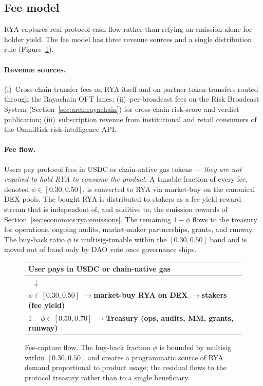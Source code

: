 \documentclass[11pt,a4paper]{article}
\begin{document}
\subsection{Fee model}\label{sec:economics:rya:fees}

RYA captures real protocol cash flow rather than relying on emission alone for
holder yield. The fee model has three revenue sources and a single distribution rule
(Figure~\ref{fig:rya-fee-flow}).

\paragraph{Revenue sources.} (i)~Cross-chain transfer fees on RYA itself and on
partner-token transfers routed through the Rayachain OFT lanes; (ii)~per-broadcast
fees on the Risk Broadcast System (Section~\ref{sec:arch:rayachain}) for cross-chain
risk-score and verdict publication; (iii)~subscription revenue from institutional
and retail consumers of the OmniRisk risk-intelligence API.

\paragraph{Fee flow.} Users pay protocol fees in USDC or chain-native gas tokens
--- \emph{they are not required to hold RYA to consume the product}. A tunable
fraction of every fee, denoted $\phi \in [0.30, 0.50]$, is converted to RYA via
market-buy on the canonical DEX pools. The bought RYA is distributed to stakers as
a fee-yield reward stream that is independent of, and additive to, the emission
rewards of Section~\ref{sec:economics:rya:emissions}. The remaining $1 - \phi$
flows to the treasury for operations, ongoing audits, market-maker partnerships,
grants, and runway. The buy-back ratio $\phi$ is multisig-tunable within the
$[0.30, 0.50]$ band and is moved out of band only by DAO vote once governance ships.

\begin{figure}[h]
\centering
\begin{small}
\begin{tabular}{l}
\hline
\textbf{User pays in USDC or chain-native gas} \\
\hline
$\;\;\downarrow$ \\
\textbf{$\phi \in [0.30, 0.50]$ \quad$\rightarrow$\quad market-buy RYA on DEX
        \quad$\rightarrow$\quad stakers (fee yield)} \\
\textbf{$1 - \phi \in [0.50, 0.70]$ \quad$\rightarrow$\quad Treasury
        (ops, audits, MM, grants, runway)} \\
\hline
\end{tabular}
\end{small}
\caption{Fee-capture flow. The buy-back fraction $\phi$ is bounded by multisig
within $[0.30, 0.50]$ and creates a programmatic source of RYA demand proportional
to product usage; the residual flows to the protocol treasury rather than to a
single beneficiary.}
\label{fig:rya-fee-flow}
\end{figure}
\end{document}
